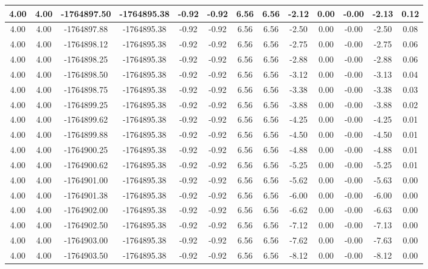 \begin{table}[htbp]
\begin{adjustbox}{angle=90}
\begin{tabular}{|c|c|c|c|c|c|c|c|c|c|c|c|c|}
 4.00 & 4.00 & -1764897.50 & -1764895.38 & -0.92 & -0.92 & 6.56 & 6.56 & -2.12 & 0.00 & -0.00 & -2.13 & 0.12\\ \hline
 4.00 & 4.00 & -1764897.88 & -1764895.38 & -0.92 & -0.92 & 6.56 & 6.56 & -2.50 & 0.00 & -0.00 & -2.50 & 0.08\\ \hline
 4.00 & 4.00 & -1764898.12 & -1764895.38 & -0.92 & -0.92 & 6.56 & 6.56 & -2.75 & 0.00 & -0.00 & -2.75 & 0.06\\ \hline
 4.00 & 4.00 & -1764898.25 & -1764895.38 & -0.92 & -0.92 & 6.56 & 6.56 & -2.88 & 0.00 & -0.00 & -2.88 & 0.06\\ \hline
 4.00 & 4.00 & -1764898.50 & -1764895.38 & -0.92 & -0.92 & 6.56 & 6.56 & -3.12 & 0.00 & -0.00 & -3.13 & 0.04\\ \hline
 4.00 & 4.00 & -1764898.75 & -1764895.38 & -0.92 & -0.92 & 6.56 & 6.56 & -3.38 & 0.00 & -0.00 & -3.38 & 0.03\\ \hline
 4.00 & 4.00 & -1764899.25 & -1764895.38 & -0.92 & -0.92 & 6.56 & 6.56 & -3.88 & 0.00 & -0.00 & -3.88 & 0.02\\ \hline
 4.00 & 4.00 & -1764899.62 & -1764895.38 & -0.92 & -0.92 & 6.56 & 6.56 & -4.25 & 0.00 & -0.00 & -4.25 & 0.01\\ \hline
 4.00 & 4.00 & -1764899.88 & -1764895.38 & -0.92 & -0.92 & 6.56 & 6.56 & -4.50 & 0.00 & -0.00 & -4.50 & 0.01\\ \hline
 4.00 & 4.00 & -1764900.25 & -1764895.38 & -0.92 & -0.92 & 6.56 & 6.56 & -4.88 & 0.00 & -0.00 & -4.88 & 0.01\\ \hline
 4.00 & 4.00 & -1764900.62 & -1764895.38 & -0.92 & -0.92 & 6.56 & 6.56 & -5.25 & 0.00 & -0.00 & -5.25 & 0.01\\ \hline
 4.00 & 4.00 & -1764901.00 & -1764895.38 & -0.92 & -0.92 & 6.56 & 6.56 & -5.62 & 0.00 & -0.00 & -5.63 & 0.00\\ \hline
 4.00 & 4.00 & -1764901.38 & -1764895.38 & -0.92 & -0.92 & 6.56 & 6.56 & -6.00 & 0.00 & -0.00 & -6.00 & 0.00\\ \hline
 4.00 & 4.00 & -1764902.00 & -1764895.38 & -0.92 & -0.92 & 6.56 & 6.56 & -6.62 & 0.00 & -0.00 & -6.63 & 0.00\\ \hline
 4.00 & 4.00 & -1764902.50 & -1764895.38 & -0.92 & -0.92 & 6.56 & 6.56 & -7.12 & 0.00 & -0.00 & -7.13 & 0.00\\ \hline
 4.00 & 4.00 & -1764903.00 & -1764895.38 & -0.92 & -0.92 & 6.56 & 6.56 & -7.62 & 0.00 & -0.00 & -7.63 & 0.00\\ \hline
 4.00 & 4.00 & -1764903.50 & -1764895.38 & -0.92 & -0.92 & 6.56 & 6.56 & -8.12 & 0.00 & -0.00 & -8.12 & 0.00\\ \hline

\end{tabular}
\end{adjustbox}
\end{table}
